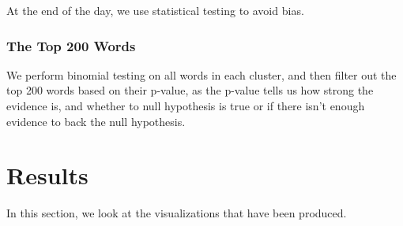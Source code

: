 \documentclass[a4paper, twocolumn]{article}
\begin{document}
\noindent At the end of the day, we use statistical testing to avoid bias.

\subsubsection{The Top 200 Words}
We perform binomial testing on all words in each cluster, and then filter out the top 200 words based on their p-value, as the p-value tells us how strong 
the evidence is, and whether to null hypothesis is true or if there isn't enough evidence to back the null hypothesis.

\section{Results}
In this section, we look at the visualizations that have been produced.
\end{document}

